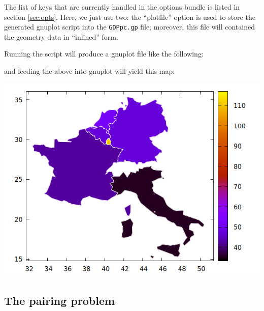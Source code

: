 \documentclass[a4paper]{article}
\begin{document}
The list of keys that are currently handled in the options bundle is
listed in section \ref{sec:opts}. Here, we just use two: the
``plotfile'' option is used to store the generated gnuplot script into
the \texttt{GDPpc.gp} file; moreover, this file will contained the
geometry data in ``inlined'' form.

Running the script will produce a gnuplot file like the following:


and feeding the above into gnuplot will yield  this map:

\begin{center}
  \includegraphics[scale=0.5]{GDPpc.png}
\end{center}

\subsection{The pairing problem}
\label{sec:pairing}
\end{document}
